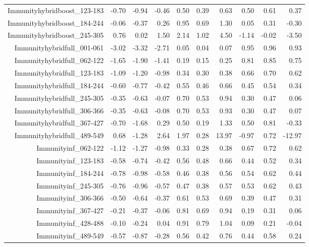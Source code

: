 \begin{table}[ht]
\begin{tabular}{rrrrrrrrrr}
  Immunityhybridboost\_123-183 & -0.70 & -0.94 & -0.46 & 0.50 & 0.39 & 0.63 & 0.50 & 0.61 & 0.37 \\ 
  Immunityhybridboost\_184-244 & -0.06 & -0.37 & 0.26 & 0.95 & 0.69 & 1.30 & 0.05 & 0.31 & -0.30 \\ 
  Immunityhybridboost\_245-305 & 0.76 & 0.02 & 1.50 & 2.14 & 1.02 & 4.50 & -1.14 & -0.02 & -3.50 \\ 
  Immunityhybridfull\_001-061 & -3.02 & -3.32 & -2.71 & 0.05 & 0.04 & 0.07 & 0.95 & 0.96 & 0.93 \\ 
  Immunityhybridfull\_062-122 & -1.65 & -1.90 & -1.41 & 0.19 & 0.15 & 0.25 & 0.81 & 0.85 & 0.75 \\ 
  Immunityhybridfull\_123-183 & -1.09 & -1.20 & -0.98 & 0.34 & 0.30 & 0.38 & 0.66 & 0.70 & 0.62 \\ 
  Immunityhybridfull\_184-244 & -0.60 & -0.77 & -0.42 & 0.55 & 0.46 & 0.66 & 0.45 & 0.54 & 0.34 \\ 
  Immunityhybridfull\_245-305 & -0.35 & -0.63 & -0.07 & 0.70 & 0.53 & 0.94 & 0.30 & 0.47 & 0.06 \\ 
  Immunityhybridfull\_306-366 & -0.35 & -0.63 & -0.08 & 0.70 & 0.53 & 0.93 & 0.30 & 0.47 & 0.07 \\ 
  Immunityhybridfull\_367-427 & -0.70 & -1.68 & 0.29 & 0.50 & 0.19 & 1.33 & 0.50 & 0.81 & -0.33 \\ 
  Immunityhybridfull\_489-549 & 0.68 & -1.28 & 2.64 & 1.97 & 0.28 & 13.97 & -0.97 & 0.72 & -12.97 \\ 
  Immunityinf\_062-122 & -1.12 & -1.27 & -0.98 & 0.33 & 0.28 & 0.38 & 0.67 & 0.72 & 0.62 \\ 
  Immunityinf\_123-183 & -0.58 & -0.74 & -0.42 & 0.56 & 0.48 & 0.66 & 0.44 & 0.52 & 0.34 \\ 
  Immunityinf\_184-244 & -0.78 & -0.98 & -0.58 & 0.46 & 0.38 & 0.56 & 0.54 & 0.62 & 0.44 \\ 
  Immunityinf\_245-305 & -0.76 & -0.96 & -0.57 & 0.47 & 0.38 & 0.57 & 0.53 & 0.62 & 0.43 \\ 
  Immunityinf\_306-366 & -0.50 & -0.64 & -0.37 & 0.61 & 0.53 & 0.69 & 0.39 & 0.47 & 0.31 \\ 
  Immunityinf\_367-427 & -0.21 & -0.37 & -0.06 & 0.81 & 0.69 & 0.94 & 0.19 & 0.31 & 0.06 \\ 
  Immunityinf\_428-488 & -0.10 & -0.24 & 0.04 & 0.91 & 0.79 & 1.04 & 0.09 & 0.21 & -0.04 \\ 
  Immunityinf\_489-549 & -0.57 & -0.87 & -0.28 & 0.56 & 0.42 & 0.76 & 0.44 & 0.58 & 0.24 \\ 

\end{tabular}
\end{table}
